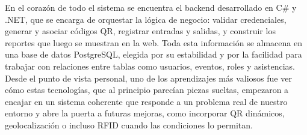 En el corazón de todo el sistema se encuentra el backend desarrollado en C\# y .NET, que se encarga de orquestar la lógica de negocio: validar credenciales, generar y asociar códigos QR, registrar entradas y salidas, y construir los reportes que luego se muestran en la web. Toda esta información se almacena en una base de datos PostgreSQL, elegida por su estabilidad y por la facilidad para trabajar con relaciones entre tablas como usuarios, eventos, roles y asistencias. Desde el punto de vista personal, uno de los aprendizajes más valiosos fue ver cómo estas tecnologías, que al principio parecían piezas sueltas, empezaron a encajar en un sistema coherente que responde a un problema real de nuestro entorno y abre la puerta a futuras mejoras, como incorporar QR dinámicos, geolocalización o incluso RFID cuando las condiciones lo permitan.